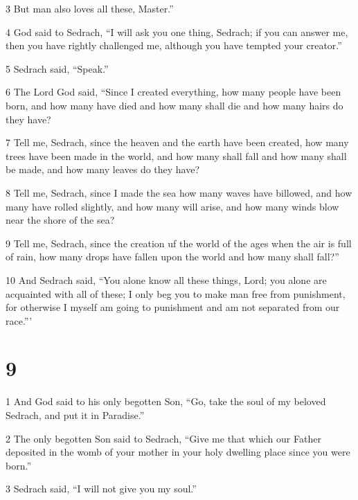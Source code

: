 \par 3 But man also loves all these, Master.” 

\par 4 God said to Sedrach, “I will ask you one thing, Sedrach; if you can answer me, then you have rightly challenged me, although you have tempted your creator.” 

\par 5 Sedrach said, “Speak.”

\par 6 The Lord God said, “Since I created everything, how many people have been born, and how many have died and how many shall die and how many hairs do they have? 

\par 7 Tell me, Sedrach, since the heaven and the earth have been created, how many trees have been made in the world, and how many shall fall and how many shall be made, and how many leaves do they have? 

\par 8 Tell me, Sedrach, since I made the sea how many waves have billowed, and how many have rolled slightly, and how many will arise, and how many winds blow near the shore of the sea? 

\par 9 Tell me, Sedrach, since the creation uf the world of the ages when the air is full of rain, how many drops have fallen upon the world and how many shall fall?” 

\par 10 And Sedrach said, “You alone know all these things, Lord; you alone are acquainted with all of these; I only beg you to make man free from punishment, for otherwise I myself am going to punishment and am not separated from our race.”’ 

\chapter{9}

\par 1 And God said to his only begotten Son, “Go, take the soul of my beloved Sedrach, and put it in Paradise.” 

\par 2 The only begotten Son said to Sedrach, “Give me that which our Father deposited in the womb of your mother in your holy dwelling place since you were born.” 

\par 3 Sedrach said, “I will not give you my soul.” 

